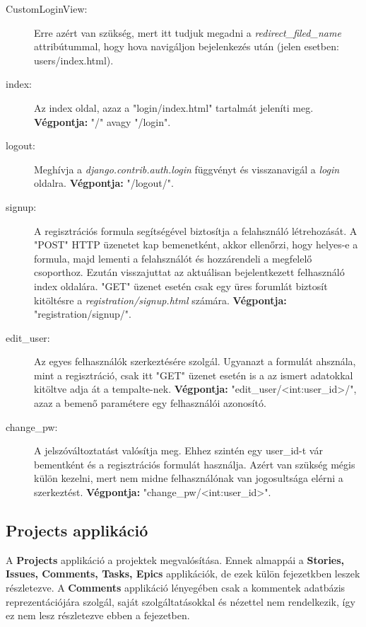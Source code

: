 \begin{itemize}
	\begin{description}
		\item[CustomLoginView:] Erre azért van szükség, mert itt tudjuk megadni a \textit{redirect\_filed\_name} attribútummal, hogy hova navigáljon bejelenkezés után (jelen esetben: users/index.html).
		\item[index:] Az index oldal, azaz a "login/index.html" tartalmát jeleníti meg. 
\textbf{Végpontja:} "/" avagy "/login".
		\item[logout:] Meghívja a  \textit{django.contrib.auth.login} függvényt és visszanavigál a \textit{login} oldalra. 
\textbf{Végpontja:} "/logout/".
		\item[signup:] A regisztrációs formula segítségével biztosítja a felahsználó létrehozását. A "POST" HTTP üzenetet kap bemenetként, akkor ellenőrzi, hogy helyes-e a formula, majd lementi a felahsználót és hozzárendeli a megfelelő csoporthoz. Ezután visszajuttat az aktuálisan bejelentkezett felhasználó index oldalára. "GET" üzenet esetén csak egy üres forumlát biztosít kitöltésre a \textit{registration/signup.html} számára. 
\textbf{Végpontja:} "registration/signup/".
		\item[edit\_user:] Az egyes felhasználók szerkeztésére szolgál. Ugyanazt a formulát ahsznála, mint a regisztráció, csak itt "GET" üzenet esetén is a az ismert adatokkal kitöltve adja át a tempalte-nek. 
\textbf{Végpontja:} "edit\_user/<int:user\_id>/", azaz a bemenő paramétere egy felhasználói azonosító.
		\item[change\_pw:] A jelszóváltoztatást valósítja meg. Ehhez szintén egy user\_id-t vár bementként és a regisztrációs formulát használja. Azért van szükség mégis külön kezelni, mert nem midne felhasználónak van jogosultsága elérni a szerkeztést. 
\textbf{Végpontja:} "change\_pw/<int:user\_id>".
	\end{description}
\end{itemize}

\subsection{Projects applikáció}

A \textbf{Projects} applikáció a projektek megvalósítása. Ennek almappái a \textbf{Stories, Issues, Comments, Tasks, Epics} applikációk, de ezek külön fejezetkben leszek részletezve. A \textbf{Comments} applikáció lényegében csak a kommentek adatbázis reprezentációjára szolgál, saját szolgáltatásokkal és nézettel nem rendelkezik, így ez nem lesz részletezve ebben a fejezetben.

